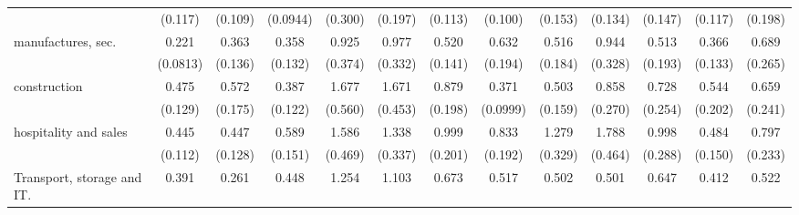 {\begin{tabular}{l*{12}{c}}
                    &     (0.117)         &     (0.109)         &    (0.0944)         &     (0.300)         &     (0.197)         &     (0.113)         &     (0.100)         &     (0.153)         &     (0.134)         &     (0.147)         &     (0.117)         &     (0.198)         \\
[1em]
manufactures, sec.  &       0.221\sym{***}&       0.363\sym{**} &       0.358\sym{**} &       0.925         &       0.977         &       0.520\sym{*}  &       0.632         &       0.516         &       0.944         &       0.513         &       0.366\sym{**} &       0.689         \\
                    &    (0.0813)         &     (0.136)         &     (0.132)         &     (0.374)         &     (0.332)         &     (0.141)         &     (0.194)         &     (0.184)         &     (0.328)         &     (0.193)         &     (0.133)         &     (0.265)         \\
[1em]
construction        &       0.475\sym{**} &       0.572         &       0.387\sym{**} &       1.677         &       1.671         &       0.879         &       0.371\sym{***}&       0.503\sym{*}  &       0.858         &       0.728         &       0.544         &       0.659         \\
                    &     (0.129)         &     (0.175)         &     (0.122)         &     (0.560)         &     (0.453)         &     (0.198)         &    (0.0999)         &     (0.159)         &     (0.270)         &     (0.254)         &     (0.202)         &     (0.241)         \\
[1em]
hospitality and sales&       0.445\sym{**} &       0.447\sym{**} &       0.589\sym{*}  &       1.586         &       1.338         &       0.999         &       0.833         &       1.279         &       1.788\sym{*}  &       0.998         &       0.484\sym{*}  &       0.797         \\
                    &     (0.112)         &     (0.128)         &     (0.151)         &     (0.469)         &     (0.337)         &     (0.201)         &     (0.192)         &     (0.329)         &     (0.464)         &     (0.288)         &     (0.150)         &     (0.233)         \\
[1em]
Transport, storage and IT.&       0.391\sym{***}&       0.261\sym{***}&       0.448\sym{*}  &       1.254         &       1.103         &       0.673         &       0.517\sym{*}  &       0.502\sym{*}  &       0.501\sym{*}  &       0.647         &       0.412\sym{**} &       0.522         \\

\end{tabular}}
